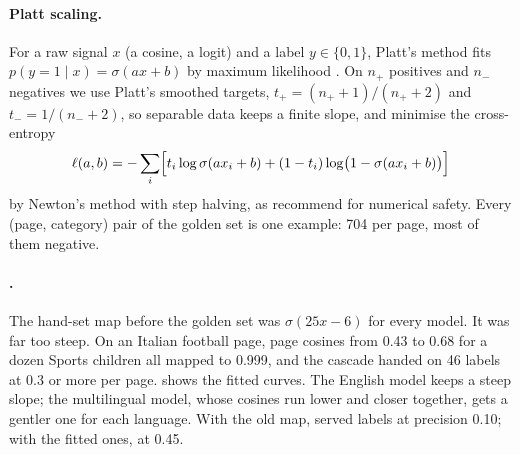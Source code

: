 \paragraph{Platt scaling.} For a raw signal $x$ (a cosine, a logit) and a label $y \in \{0,1\}$, Platt's method fits $p(y = 1 \mid x) = \sigma(ax+b)$ by maximum likelihood \citep{platt1999probabilistic}. On $n_+$ positives and $n_-$ negatives we use Platt's smoothed targets, $t_+ = (n_+ + 1)/(n_+ + 2)$ and $t_- = 1/(n_- + 2)$, so separable data keeps a finite slope, and minimise the cross-entropy
\begin{equation}\label{eq:cascade-platt}
  \ell(a, b) = -\sum_{i} \Bigl[t_i \log \sigma(a x_i + b) + (1 - t_i)\log\bigl(1 - \sigma(a x_i + b)\bigr)\Bigr]
\end{equation}
by Newton's method with step halving, as \citet{lin2007note} recommend for numerical safety. Every (page, category) pair of the golden set is one example: 704 per page, most of them negative.

\paragraph{.} The hand-set map before the golden set was $\sigma(25x - 6)$ for every model. It was far too steep. On an Italian football page, page cosines from 0.43 to 0.68 for a dozen Sports children all mapped to 0.999, and the cascade handed on 46 labels at 0.3 or more per page.  shows the fitted curves. The English model keeps a steep slope; the multilingual model, whose cosines run lower and closer together, gets a gentler one for each language. With the old map,  served labels at precision 0.10; with the fitted ones, at 0.45.

